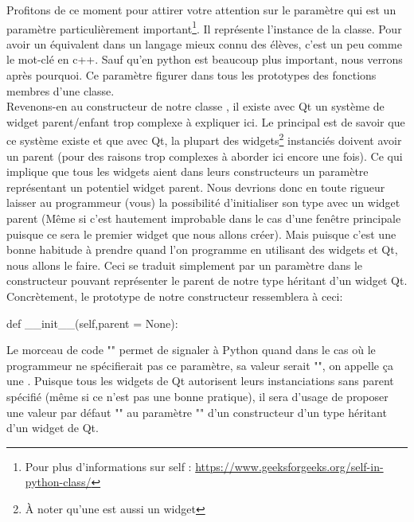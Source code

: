 {Profitons de ce moment pour attirer votre attention sur le paramètre  qui est un paramètre particulièrement important\footnote{Pour plus d'informations sur self : \url{https://www.geeksforgeeks.org/self-in-python-class/}}. Il représente l'instance de la classe. Pour avoir un équivalent dans un langage mieux connu des élèves, c'est un peu comme le mot-clé  en c++. Sauf qu'en python  est beaucoup plus important, nous verrons après pourquoi.\newline
Ce paramètre  figurer dans tous les prototypes des fonctions membres d'une classe.\\

Revenons-en au constructeur de notre classe , il existe avec Qt un système de widget parent/enfant trop complexe à expliquer ici. Le principal est de savoir que ce système existe et que avec Qt, la plupart des widgets\footnote{À noter qu'une  est aussi un widget} instanciés doivent avoir un parent (pour des raisons trop complexes à aborder ici encore une fois). Ce qui implique que tous les widgets aient dans leurs constructeurs un paramètre représentant un potentiel widget parent.\vskip 0cm %
Nous devrions donc en toute rigueur laisser au programmeur (vous) la possibilité d'initialiser son type avec un widget parent (Même si c'est hautement improbable dans le cas d'une fenêtre principale puisque ce sera le premier widget que nous allons créer). Mais puisque c'est une bonne habitude à prendre quand l'on programme en utilisant des widgets et Qt, nous allons le faire.\newline
Ceci se traduit simplement par un paramètre  dans le constructeur pouvant représenter le parent de notre type héritant d'un widget Qt.\newline
Concrètement, le prototype de notre constructeur ressemblera à ceci:
\begin{Python}
def __init__(self,parent = None):
\end{Python}
Le morceau de code "" permet de signaler à Python quand dans le cas où le programmeur ne spécifierait pas ce paramètre, sa valeur serait "", on appelle ça une .\newline
Puisque tous les widgets de Qt autorisent leurs instanciations sans parent spécifié (même si ce n'est pas une bonne pratique), il sera d'usage de proposer une valeur par défaut "" au paramètre "" d'un constructeur d'un type héritant d'un widget de Qt.\\

}
